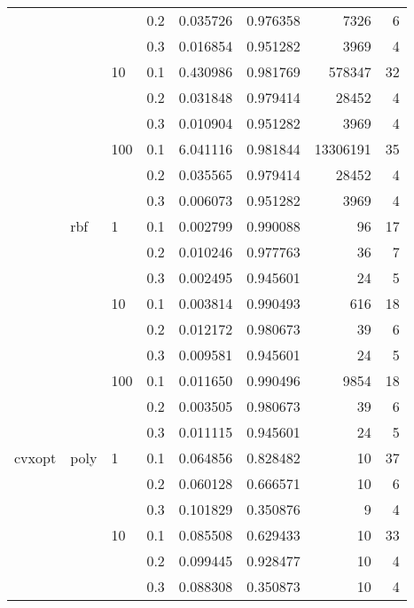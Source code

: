 \begin{table}[H]
\begin{tabular}{llllrrrr}
       &     &     & 0.2 &     0.035726 &  0.976358 &      7326 &     6 \\
       &     &     & 0.3 &     0.016854 &  0.951282 &      3969 &     4 \\
       &     & 10  & 0.1 &     0.430986 &  0.981769 &    578347 &    32 \\
       &     &     & 0.2 &     0.031848 &  0.979414 &     28452 &     4 \\
       &     &     & 0.3 &     0.010904 &  0.951282 &      3969 &     4 \\
       &     & 100 & 0.1 &     6.041116 &  0.981844 &  13306191 &    35 \\
       &     &     & 0.2 &     0.035565 &  0.979414 &     28452 &     4 \\
       &     &     & 0.3 &     0.006073 &  0.951282 &      3969 &     4 \\
       & rbf & 1   & 0.1 &     0.002799 &  0.990088 &        96 &    17 \\
       &     &     & 0.2 &     0.010246 &  0.977763 &        36 &     7 \\
       &     &     & 0.3 &     0.002495 &  0.945601 &        24 &     5 \\
       &     & 10  & 0.1 &     0.003814 &  0.990493 &       616 &    18 \\
       &     &     & 0.2 &     0.012172 &  0.980673 &        39 &     6 \\
       &     &     & 0.3 &     0.009581 &  0.945601 &        24 &     5 \\
       &     & 100 & 0.1 &     0.011650 &  0.990496 &      9854 &    18 \\
       &     &     & 0.2 &     0.003505 &  0.980673 &        39 &     6 \\
       &     &     & 0.3 &     0.011115 &  0.945601 &        24 &     5 \\
cvxopt & poly & 1   & 0.1 &     0.064856 &  0.828482 &        10 &    37 \\
       &     &     & 0.2 &     0.060128 &  0.666571 &        10 &     6 \\
       &     &     & 0.3 &     0.101829 &  0.350876 &         9 &     4 \\
       &     & 10  & 0.1 &     0.085508 &  0.629433 &        10 &    33 \\
       &     &     & 0.2 &     0.099445 &  0.928477 &        10 &     4 \\
       &     &     & 0.3 &     0.088308 &  0.350873 &        10 &     4 \\

\end{tabular}
\end{table}
